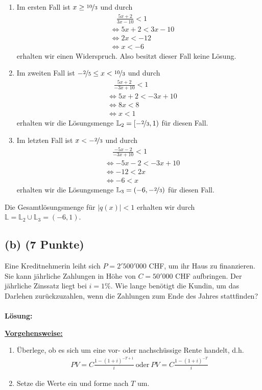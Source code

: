 \begin{enumerate}
\item Im ersten Fall ist $x \geq \nicefrac{10}{3}$ und durch
\begin{align*}
&\ \ \ \ \frac{5x+2}{3x-10} < 1\\ 
&\Leftrightarrow
5x+2 < 3x-10\\
&\Leftrightarrow
2x < -12\\
&\Leftrightarrow
x< -6
\end{align*}
erhalten wir einen Widerspruch. Also besitzt dieser Fall keine Lösung.
\item
Im zweiten Fall ist $-\nicefrac{2}{5} \leq x < \nicefrac{10}{3}$ und durch
\begin{align*}
&\ \ \ \  \frac{5x+2}{-3x+10} < 1\\
&\Leftrightarrow
5x + 2 < -3x +10\\
&\Leftrightarrow
8x < 8\\
&\Leftrightarrow
x < 1
\end{align*}
erhalten wir die Lösungsmenge $\mathbb{L}_2=[-\nicefrac{2}{3},1) $ für diesen Fall.
\item
Im letzten Fall ist $x < -\nicefrac{2}{3}$ und durch
\begin{align*}
&\ \ \ \ \ \frac{-5x-2}{-3x+10} < 1\\
&\Leftrightarrow
-5x -2 < -3x +10\\
&\Leftrightarrow
-12 < 2x \\
&\Leftrightarrow
-6 < x
\end{align*}
erhalten wir die Lösungsmenge $\mathbb{L}_3=(-6,-\nicefrac{2}{3})$ für diesen Fall.
\end{enumerate}
Die Gesamtlösungsmenge für $|q(x)|< 1$ erhalten wir durch $\mathbb{L} = \mathbb{L}_2 \cup \mathbb{L}_3 = (-6,1)$.

\newpage
\subsection*{(b) (7 Punkte)} 
Eine Kreditnehmerin leiht sich $P=2'500'000$ CHF, um ihr Haus zu finanzieren.
Sie kann jährliche Zahlungen in Höhe von $C=50'000$ CHF aufbringen.
Der jährliche Zinssatz liegt bei $i = 1 \%$. Wie lange benötigt die Kundin, um das Darlehen zurückzuzahlen, wenn die Zahlungen zum Ende des Jahres stattfinden? 
\\
\\
\textbf{Lösung:}
\begin{mdframed}
\underline{\textbf{Vorgehensweise:}}
\begin{enumerate}
\item Überlege, ob es sich um eine vor- oder nachschüssige Rente handelt, d.h.
\begin{align*}
PV = C \frac{1-(1+i)^{-T+1}}{i} 
\ \text{oder} \
PV = C \frac{1-(1+i)^{-T}}{i}
\end{align*}
\item Setze die Werte ein und forme nach $T$ um.   
\end{enumerate}
\end{mdframed}

